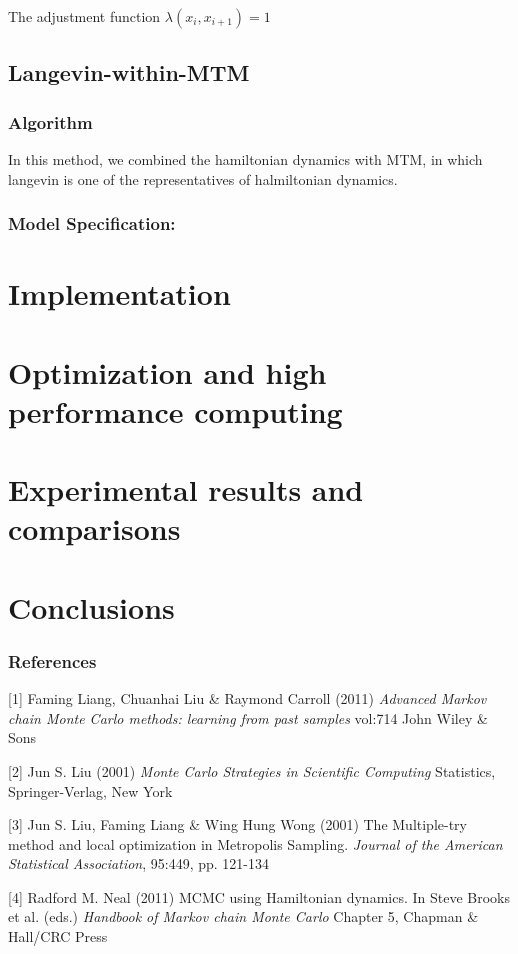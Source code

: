 \documentclass{article} %
\begin{document}
The adjustment function $\lambda (x_i,x_{i+1}) = 1$


\subsection{Langevin-within-MTM}
\subsubsection{Algorithm}
In this method, we combined the hamiltonian dynamics with MTM, in which langevin is one of the representatives of halmiltonian dynamics.    


\subsubsection{Model Specification: }


\newpage
\section{Implementation}



\section{Optimization and high performance computing}



\section{Experimental results and comparisons}


\section{Conclusions}


\subsubsection*{References}


\small{
[1] Faming Liang, Chuanhai Liu \& Raymond Carroll (2011) {\it Advanced Markov chain Monte Carlo methods: learning from past samples} vol:714 John Wiley \& Sons

[2] Jun S. Liu (2001) {\it Monte Carlo Strategies in Scientific Computing} Statistics, Springer-Verlag, New York

[3] Jun S. Liu, Faming Liang \& Wing Hung Wong (2001) The Multiple-try method and local optimization in Metropolis Sampling. {\it Journal of the American Statistical Association}, 95:449, pp. 121-134

[4] Radford M. Neal (2011) MCMC using Hamiltonian dynamics. In Steve Brooks et al. (eds.) {\it Handbook of Markov chain Monte Carlo} Chapter 5, Chapman \& Hall/CRC Press
}
\end{document}
